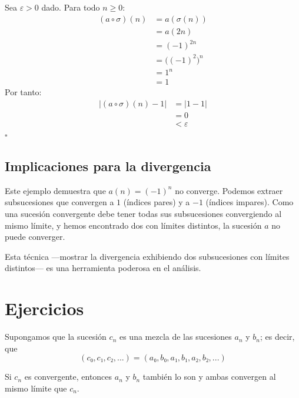  Sea $\varepsilon>0$ dado. Para todo $n\geq 0$:
    \begin{align*}
      (a\circ\sigma)(n) &= a(\sigma(n)) \\
               &= a(2n)   \\
               &= (-1)^{2n} \\
               &= \bigl((-1)^2\bigr)^n \\
               &= 1^n \\
               &= 1
    \end{align*}
  Por tanto:
    \begin{align*}
      |(a\circ\sigma)(n)-1| &= |1-1| \\
                   &= 0 \\
                   &< \varepsilon
    \end{align*}
  \hfill$\square$

\subsection{Implicaciones para la divergencia}

Este ejemplo demuestra que $a(n)=(-1)^n$ no converge. Podemos extraer
subsucesiones que convergen a $1$ (índices pares) y a $-1$ (índices impares).
Como una sucesión convergente debe tener todas sus subsucesiones convergiendo
al mismo límite, y hemos encontrado dos con límites distintos, la sucesión $a$
no puede converger.

Esta técnica —mostrar la divergencia exhibiendo dos subsucesiones con límites
distintos— es una herramienta poderosa en el análisis.

\section{Ejercicios}

\begin{ejercicio}
  Supongamos que la sucesión \(c_n\) es una mezcla de las sucesiones
  \(a_n\) y \(b_n\); es decir, que
  \[ (c₀, c₁, c₂, ...) = (a₀, b₀, a₁, b₁, a₂, b₂, ...) \]

  Si \(c_n\) es convergente, entonces \(a_n\) y \(b_n\) también lo son y
  ambas convergen al mismo límite que \(c_n\).
\end{ejercicio}

